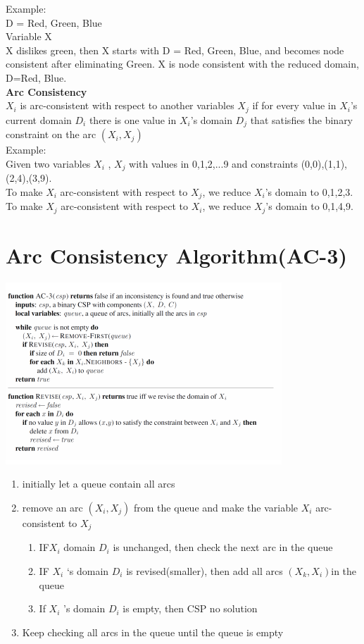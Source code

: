 Example:\\
D = {Red, Green, Blue}\\
Variable X\\
X dislikes green, then X starts with D = {Red, Green, Blue}, and becomes node consistent after eliminating {Green}.
X is node consistent with the reduced domain, D={Red, Blue}.\\

\textbf{Arc Consistency}\\
$X_i$ is arc-consistent with respect to another variables $X_j$ if for every value in $X_i$’s current domain $D_i$ there is one value in $X_i$’s domain $D_j$ that satisfies the binary constraint on the arc $(X_i , X_j)$\\[3ex]

Example:\\
Given two variables $X_i$ , $X_j$ with values in {0,1,2,...9} and constraints 
(0,0),(1,1),(2,4),(3,9).\\
To make $X_i$ arc-consistent with respect to $X_j$, we reduce $X_i$’s domain to {0,1,2,3}.\\
To make $X_j$ arc-consistent with respect to $X_i$, we reduce $X_j$’s domain to {0,1,4,9}.\\

\section{Arc Consistency Algorithm(AC-3)}
\includegraphics[scale=1]{chap1_pics/1nAyMlelLl-LW-ECO-Akl5AsNAugdRshrNF4o7Q.png} 
\begin{enumerate}
\item initially let a queue contain all arcs
\item remove an arc $(X_i , X_j)$ from the queue and make the variable $X_i$ arc-consistent to $X_j$
\begin{enumerate}
\item IF$ X_i$ domain $D_i$ is unchanged, then check the next arc in the queue
\item IF $X_i$ ‘s domain $D_i$ is revised(smaller), then add all arcs $(X_k, X_i) $in the queue 
\item If $X_i$ ’s domain $D_i$ is empty, then CSP no solution
\end{enumerate}
\item Keep checking all arcs in the queue until the queue is empty 
\end{enumerate}

